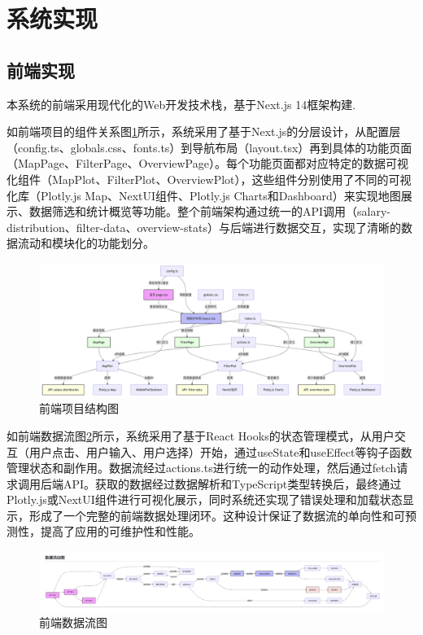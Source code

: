 \section{系统实现}

\subsection{前端实现}

本系统的前端采用现代化的Web开发技术栈，基于Next.js 14框架构建.


如前端项目的组件关系图\ref{fig:front_end_structure}所示，系统采用了基于Next.js的分层设计，从配置层（config.ts、globals.css、fonts.ts）到导航布局（layout.tsx）再到具体的功能页面（MapPage、FilterPage、OverviewPage）。每个功能页面都对应特定的数据可视化组件（MapPlot、FilterPlot、OverviewPlot），这些组件分别使用了不同的可视化库（Plotly.js Map、NextUI组件、Plotly.js Charts和Dashboard）来实现地图展示、数据筛选和统计概览等功能。整个前端架构通过统一的API调用（salary-distribution、filter-data、overview-stats）与后端进行数据交互，实现了清晰的数据流动和模块化的功能划分。

\begin{figure}[htbp]
    \centering
    \includegraphics[width=1.0\textwidth]{figures/前端项目结构图.png}
    \caption{前端项目结构图}
    \label{fig:front_end_structure}
\end{figure}

如前端数据流图\ref{fig:front_end_data_flow}所示，系统采用了基于React Hooks的状态管理模式，从用户交互（用户点击、用户输入、用户选择）开始，通过useState和useEffect等钩子函数管理状态和副作用。数据流经过actions.ts进行统一的动作处理，然后通过fetch请求调用后端API。获取的数据经过数据解析和TypeScript类型转换后，最终通过Plotly.js或NextUI组件进行可视化展示，同时系统还实现了错误处理和加载状态显示，形成了一个完整的前端数据处理闭环。这种设计保证了数据流的单向性和可预测性，提高了应用的可维护性和性能。


\begin{figure}[htbp]
    \centering
    \includegraphics[width=1.0\textwidth]{figures/前端数据流图.png}
    \caption{前端数据流图}
    \label{fig:front_end_data_flow}
\end{figure}




